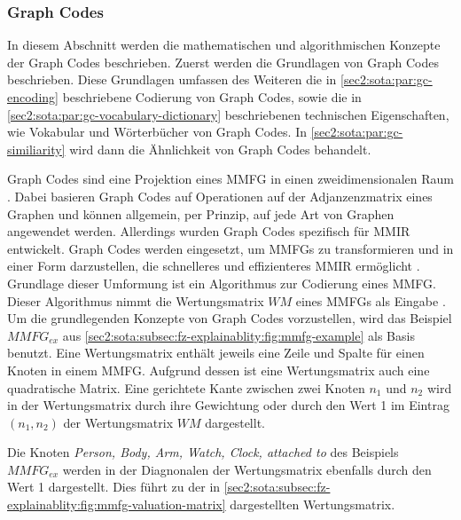 \subsubsection{Graph Codes}
\label{sec2:sota:subsubsec:graph-codes}
In diesem Abschnitt werden die mathematischen und algorithmischen Konzepte der Graph Codes beschrieben.
Zuerst werden die Grundlagen von Graph Codes beschrieben.
Diese Grundlagen umfassen des Weiteren die in \cref{sec2:sota:par:gc-encoding} beschriebene Codierung von Graph Codes, sowie die in \cref{sec2:sota:par:gc-vocabulary-dictionary} beschriebenen technischen Eigenschaften, wie Vokabular und Wörterbücher von Graph Codes.
In \cref{sec2:sota:par:gc-similiarity} wird dann die Ähnlichkeit von Graph Codes behandelt.

Graph Codes sind eine Projektion eines MMFG in einen zweidimensionalen Raum \cite{gc-2d-proj-mmfg}.
Dabei basieren Graph Codes auf Operationen auf der Adjanzenzmatrix eines Graphen und können allgemein, per Prinzip, auf jede Art von Graphen angewendet werden.
Allerdings wurden Graph Codes spezifisch für MMIR entwickelt.
Graph Codes werden eingesetzt, um MMFGs zu transformieren und in einer Form darzustellen, die schnelleres und effizienteres MMIR ermöglicht \cite{fast-effec-retr-large-collec}.
Grundlage dieser Umformung ist ein Algorithmus zur Codierung eines MMFG.
Dieser Algorithmus nimmt die Wertungsmatrix $WM$ eines MMFGs als Eingabe \cite{gc-2d-proj-mmfg}.
Um die grundlegenden Konzepte von Graph Codes vorzustellen, wird das Beispiel $MMFG_{ex}$ aus \cref{sec2:sota:subsec:fz-explainablity:fig:mmfg-example} als Basis benutzt.
Eine Wertungsmatrix enthält jeweils eine Zeile und Spalte für einen Knoten in einem MMFG.
Aufgrund dessen ist eine Wertungsmatrix auch eine quadratische Matrix.
Eine gerichtete Kante zwischen zwei Knoten $n_1$ und $n_2$ wird in der Wertungsmatrix durch ihre Gewichtung oder durch den Wert 1 im Eintrag $(n_1,n_2)$ der Wertungsmatrix $WM$ dargestellt.

Die Knoten \textit{Person, Body, Arm, Watch, Clock, attached to} des Beispiels $MMFG_{ex}$ werden in der Diagnonalen der Wertungsmatrix ebenfalls durch den Wert 1 dargestellt.
Dies führt zu der in \cref{sec2:sota:subsec:fz-explainablity:fig:mmfg-valuation-matrix} dargestellten Wertungsmatrix.


